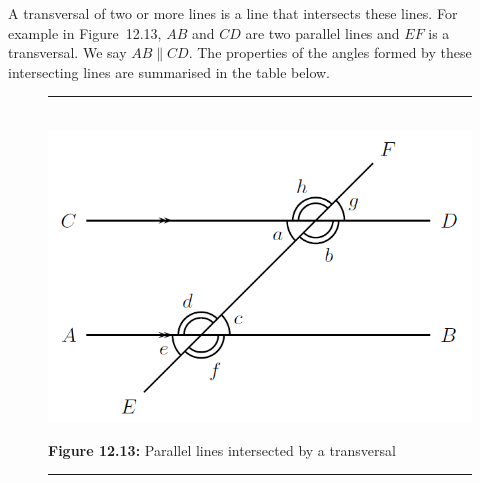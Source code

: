 A transversal of two or more lines is a line that intersects these lines. For example in Figure~12.13, $AB$ and $CD$ are two parallel lines and $EF$ is a transversal. We say $AB\parallel CD$. The properties of the angles formed by these intersecting lines are summarised in the table below.\par 
\setcounter{subfigure}{0}
\begin{figure}[H] %
\begin{center}
\rule[.1in]{\figurerulewidth}{.005in} \\
\label{m39370*uid29!!!underscore!!!media}\label{m39370*uid29!!!underscore!!!printimage}\includegraphics[width=.8\columnwidth]{col11306.imgs/m39370_MG10C13_011.png} %
\vspace{2pt}
\vspace{\rubberspace}\par \begin{cnxcaption}
\small \textbf{Figure 12.13: }Parallel lines intersected by a transversal
\end{cnxcaption}
\vspace{.1in}
\rule[.1in]{\figurerulewidth}{.005in} \\
\end{center}
\end{figure}       

